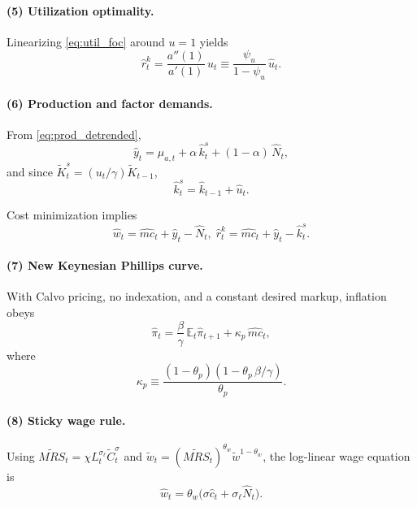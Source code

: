 \paragraph{(5) Utilization optimality.}
Linearizing \eqref{eq:util_foc} around $u=1$ yields
\begin{equation}
	\hat r^k_t = \frac{a''(1)}{a'(1)}\,\hat u_t \equiv \frac{\psi_u}{1 - \psi_u}\,\hat u_t.
	\label{eq:loglin_u}
\end{equation}

\paragraph{(6) Production and factor demands.}
From \eqref{eq:prod_detrended},
\begin{equation}
	\hat y_t = \hat\mu_{a,t} + \alpha\,\hat k_t^s + (1-\alpha)\,\hat N_t,
\end{equation}
and since $\tilde K_t^s=(u_t/\gamma)\tilde K_{t-1}$,
\begin{equation}
	\hat k_t^s = \hat k_{t-1} + \hat u_t.
\end{equation}

Cost minimization implies
\begin{equation}
	\hat w_t = \hat{mc}_t + \hat y_t - \hat N_t,
	\;
	\hat r^k_t = \hat{mc}_t + \hat y_t - \hat k_t^s.
	\label{eq:loglin_factorprices}
\end{equation}

\paragraph{(7) New Keynesian Phillips curve.}
With Calvo pricing, no indexation, and a constant desired markup, inflation obeys
\begin{equation}
	\hat\pi_t = \frac{\beta}{\gamma}\,\mathbb{E}_t\hat\pi_{t+1} + \kappa_p\,\hat{mc}_t,
	\label{eq:nkpc}
\end{equation}
where
\begin{equation}
	\kappa_p \equiv \frac{(1-\theta_p)(1-\theta_p\,\beta/\gamma)}{\theta_p}.
\end{equation}

\paragraph{(8) Sticky wage rule.}
Using $\widetilde{MRS}_t=\chi L_t^{\sigma_\ell}\tilde C_t^{\sigma}$ and $\tilde w_t=(\widetilde{MRS}_t)^{\theta_w}\tilde w^{1-\theta_w}$, the log-linear wage equation is
\begin{equation}
	\hat w_t = \theta_w\big(\sigma\hat c_t + \sigma_\ell\hat N_t\big).
	\label{eq:loglin_wage}
\end{equation}

